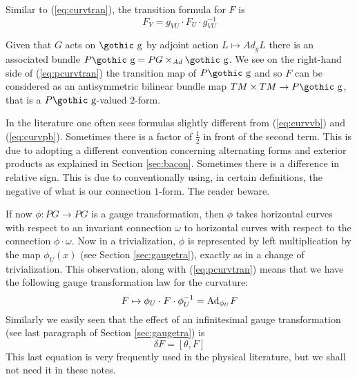 \documentclass[12pt,titlepage]{article}
\def\goth#1{\hbox{\gothic #1}}
\def\gg{{\goth g}}
\def\Ad{\hbox{Ad}}
\begin{document}
Similar to (\ref{eq:curvtran}), the transition formula for \(F\) is
\begin{equation}\label{eq:pcurvtran}
F_V= g_{VU}\cdot F_U \cdot g_{VU}^{-1}
\end{equation}

Given that \(G\) acts on \(\gg\) by adjoint action \(L\mapsto Ad_gL\)
there is an associated bundle \(P \gg = PG \times_{Ad} \gg\). We see on
the right-hand side of (\ref{eq:pcurvtran}) the transition map of \(P
\gg\) and so \(F\) can be considered as an antisymmetric bilinear
bundle map
\(TM \times TM \to P \gg\), that is a \(P \gg\)-valued \(2\)-form. 



In the literature one often sees formulas slightly different from
(\ref{eq:curvvb}) and (\ref{eq:curvpb}). Sometimes there is a factor of
\(\frac{1}{2}\) in front of the second term. This is due to adopting a
different convention concerning alternating forms and exterior products
as explained in Section \ref{sec:bacon}. Sometimes there is a difference
in relative sign. This is due to conventionally using, in 
certain definitions, the negative of
what is our connection \(1\)-form. The reader beware.


If now \(\phi:PG \to PG\) is a gauge transformation, then \(\phi\) takes
horizontal curves with respect to an invariant connection \(\omega\) to
horizontal curves with respect to the connection \(\phi\cdot  \omega\). Now
in a trivialization, \(\phi\) is represented by left multiplication by
the map \(\phi_U(x)\) (see Section \ref{sec:gaugetra}),  exactly as
in a change of trivialization. This observation, along with
(\ref{eq:pcurvtran}) 
means that we have the following
gauge transformation law for the curvature:
\begin{equation} \label{eq:cug}%
 F \mapsto \phi_U\cdot F\cdot \phi_U^{-1} = \Ad_{\phi_U}F
 \end{equation}%
 Similarly we easily seen that the effect
of an infinitesimal gauge transformation (see last paragraph of Section
\ref{sec:gaugetra}) is
\[%
 \delta F = [\theta, F]
 \]%
This last equation is very frequently used in the physical literature, but
we shall not need it in these notes.
\end{document}
